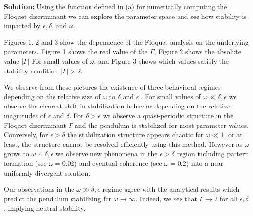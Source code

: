 \documentclass[12pt, a4paper]{article}
\begin{document}
\begin{enumerate}
\begin{enumerate}
        \textbf{Solution:} Using the function defined in (a) for numerically computing the Floquet discriminant we can explore the parameter space and see how stability is impacted by $\epsilon, \delta$, and $\omega$. 

        Figures 1, 2 and 3 show the dependence of the Floquet analysis on the underlying parameters. Figure 1 shows the real value of the $\Gamma$, Figure 2 shows the absolute value $|\Gamma|$ For small values of $\omega$, and Figure 3 shows which values satisfy the stability condition $|\Gamma|>2$. 
        
        We observe from these pictures the existence of three behavioral regimes depending on the relative size of $\omega$ to $\delta$ and $\epsilon$.. For small values of $\omega \ll \delta, \epsilon$ we observe the clearest shift in stabilization behavior depending on the relative magnitudes of $\epsilon$ and $\delta$. For $\delta>\epsilon$ we observe a quasi-periodic structure in the Floquet discriminant $\Gamma$ and the pendulum is stabilized for most parameter values. Conversely, for $\epsilon > \delta$ the stabilization structure appears chaotic for $\omega \ll 1$, or at least, the structure cannot be resolved efficiently using this method. However as $\omega$ grows to $\omega \sim \delta, \epsilon$ we observe new phenomena in the $\epsilon > \delta$ region including pattern formation (see $\omega=0.02$) and eventual coherence (see $\omega=0.2$) into a near-uniformly divergent solution. 

        Our observations in the $\omega \gg \delta, \epsilon$ regime agree with the analytical results which predict the pendulum stabilizing for $\omega \rightarrow \infty$. Indeed, we see that $\Gamma \rightarrow 2$ for all $\epsilon, \delta$, implying neutral stability. 


\end{enumerate}
\end{enumerate}
\end{document}
